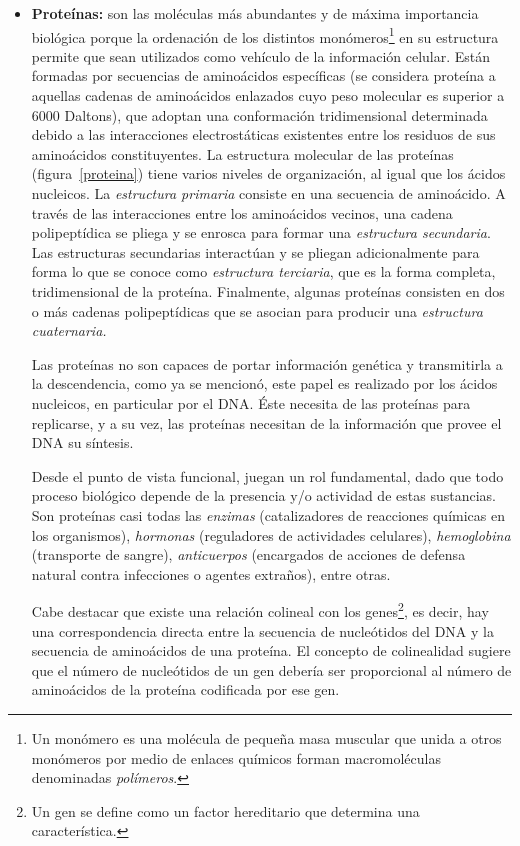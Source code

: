 \begin{itemize}
	\item \textbf{Proteínas:} son las moléculas más abundantes y de máxima importancia biológica porque la ordenación de los distintos monómeros\footnote{Un monómero es una molécula de pequeña masa muscular que unida a otros monómeros por medio de enlaces químicos forman macromoléculas denominadas \emph{polímeros}.} en su estructura permite que sean utilizados como vehículo de la información celular.
	Están formadas por secuencias de aminoácidos específicas (se considera proteína a aquellas cadenas de aminoácidos enlazados cuyo peso molecular es superior a 6000 Daltons), que adoptan una conformación tridimensional determinada debido a las interacciones electrostáticas existentes entre los residuos de sus aminoácidos constituyentes. 
	La estructura molecular de las proteínas (figura~\ref{proteina}) tiene varios niveles de organización, al igual que los ácidos nucleicos. La \textit{estructura primaria} consiste en una secuencia de aminoácido.
    A través de las interacciones entre los aminoácidos vecinos, una cadena polipeptídica se pliega y se enrosca para formar una \textit{estructura secundaria}. Las estructuras secundarias interactúan y se pliegan adicionalmente para forma lo que se conoce como \textit{estructura terciaria}, que es la forma completa, tridimensional de la proteína. Finalmente, algunas proteínas consisten en dos o más cadenas polipeptídicas que se asocian para producir una \textit{estructura cuaternaria.} 
	\par Las proteínas no son capaces de portar información genética y transmitirla a la descendencia, como ya se mencionó, este papel es realizado por los ácidos nucleicos, en particular por el DNA. Éste necesita de las proteínas para replicarse, y a su vez, las proteínas necesitan de la información que provee el DNA su síntesis.					
	\par Desde el punto de vista funcional, juegan un rol fundamental, dado que todo proceso biológico
	depende de la presencia y/o actividad de estas sustancias. Son proteínas casi todas las \textit{enzimas}
	(catalizadores de reacciones químicas en los organismos), \textit{hormonas} (reguladores de actividades celulares), \textit{hemoglobina} (transporte de sangre), \textit{anticuerpos} (encargados de acciones de defensa natural contra infecciones o agentes extraños), entre otras.
	\par Cabe destacar que existe una relación colineal con los genes\footnote{Un gen se define como un factor hereditario que determina una característica.}, es decir, hay una correspondencia directa entre la secuencia de nucleótidos del DNA y la secuencia de aminoácidos de una proteína. El concepto de colinealidad sugiere que el número de nucleótidos de un gen debería ser proporcional al número de aminoácidos de la proteína codificada por ese gen.


\end{itemize}
